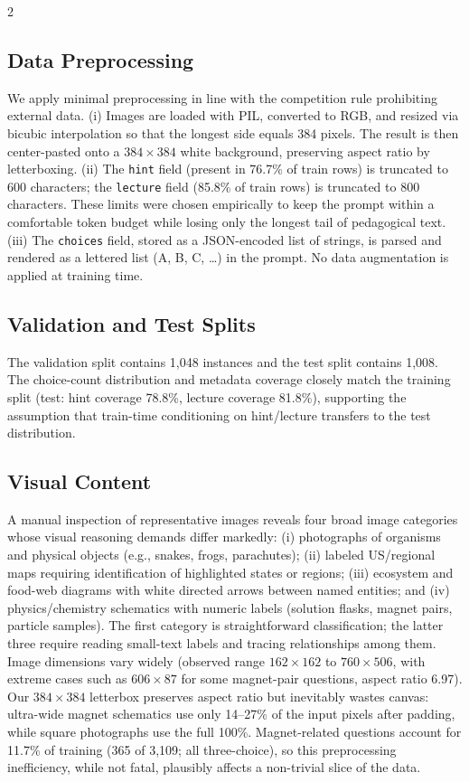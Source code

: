 \documentclass[11pt,a4paper]{article}
\begin{document}
\begin{multicols}{2}
\subsection{Data Preprocessing}

We apply minimal preprocessing in line with the competition rule prohibiting external data. (i) Images are loaded with PIL, converted to RGB, and resized via bicubic interpolation so that the longest side equals 384 pixels. The result is then center-pasted onto a $384\times384$ white background, preserving aspect ratio by letterboxing. (ii) The \texttt{hint} field (present in 76.7\% of train rows) is truncated to 600 characters; the \texttt{lecture} field (85.8\% of train rows) is truncated to 800 characters. These limits were chosen empirically to keep the prompt within a comfortable token budget while losing only the longest tail of pedagogical text. (iii) The \texttt{choices} field, stored as a JSON-encoded list of strings, is parsed and rendered as a lettered list (A, B, C, \ldots) in the prompt. No data augmentation is applied at training time.

\subsection{Validation and Test Splits}

The validation split contains 1{,}048 instances and the test split contains 1{,}008. The choice-count distribution and metadata coverage closely match the training split (test: hint coverage 78.8\%, lecture coverage 81.8\%), supporting the assumption that train-time conditioning on hint/lecture transfers to the test distribution.

\subsection{Visual Content}

A manual inspection of representative images reveals four broad image categories whose visual reasoning demands differ markedly: (i) photographs of organisms and physical objects (e.g., snakes, frogs, parachutes); (ii) labeled US/regional maps requiring identification of highlighted states or regions; (iii) ecosystem and food-web diagrams with white directed arrows between named entities; and (iv) physics/chemistry schematics with numeric labels (solution flasks, magnet pairs, particle samples). The first category is straightforward classification; the latter three require reading small-text labels and tracing relationships among them. Image dimensions vary widely (observed range $162{\times}162$ to $760{\times}506$, with extreme cases such as $606{\times}87$ for some magnet-pair questions, aspect ratio 6.97). Our $384{\times}384$ letterbox preserves aspect ratio but inevitably wastes canvas: ultra-wide magnet schematics use only 14--27\% of the input pixels after padding, while square photographs use the full 100\%. Magnet-related questions account for 11.7\% of training (365 of 3{,}109; all three-choice), so this preprocessing inefficiency, while not fatal, plausibly affects a non-trivial slice of the data.


\end{multicols}
\end{document}

